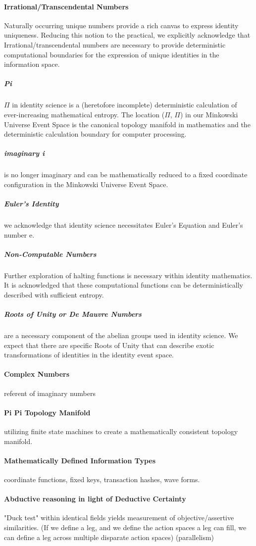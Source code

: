 \documentclass{article}
\begin{document}
		\paragraph{Irrational/Transcendental Numbers}  Naturally occurring unique numbers provide a rich canvas to express identity uniqueness.  Reducing this notion to the practical, we explicitly acknowledge that Irrational/transcendental numbers are necessary to provide deterministic computational boundaries for the expression of unique identities in the information space.
			\subparagraph{Pi} $\Pi$ in identity science is a (heretofore incomplete) deterministic calculation of ever-increasing mathematical entropy.  The location ($\Pi$, $\Pi$) in our Minkowski Universe Event Space is the canonical topology manifold in mathematics and the deterministic calculation boundary for computer processing.
			\subparagraph{imaginary i} is no longer imaginary and can be mathematically reduced to a fixed coordinate configuration in the Minkowski Universe Event Space.
			\subparagraph{Euler's Identity} we acknowledge that identity science necessitates Euler's Equation and Euler's number e.  
			\subparagraph{Non-Computable Numbers}  Further exploration of halting functions is necessary within identity mathematics.  It is acknowledged that these computational functions can be deterministically described with sufficient entropy. 
			\subparagraph{Roots of Unity or De Mauvre Numbers}  are a necessary component of the abelian groups used in identity science.  We expect that there are specific Roots of Unity that can describe exotic transformations of identities in the identity event space.
		\paragraph{Complex Numbers} referent of imaginary numbers
		\paragraph{Pi Pi Topology Manifold} utilizing finite state machines to create a mathematically consistent topology manifold.
		\paragraph{Mathematically Defined Information Types} coordinate functions, fixed keys, transaction hashes, wave forms.
		\paragraph{Abductive reasoning in light of Deductive Certainty}
				"Duck test" within identical fields yields measurement of objective/assertive similarities.
				(If we define a leg, and we define the action spaces a leg can fill, we can define a leg across multiple disparate action spaces)  (parallelism)
\end{document}
